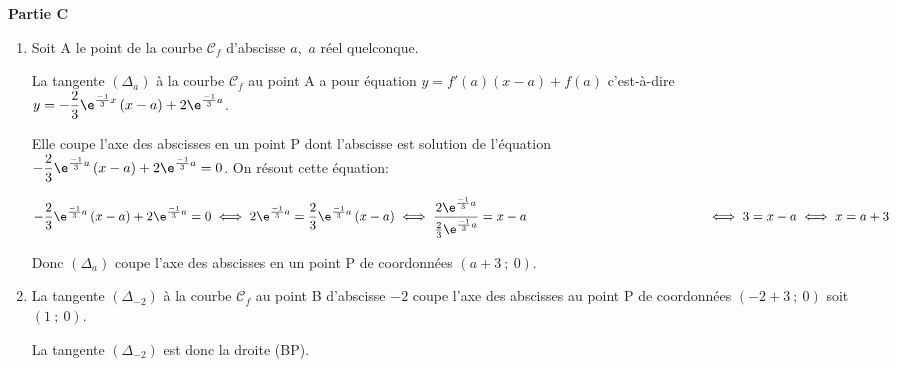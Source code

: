 \bigskip

\textbf{Partie C}

\medskip

\begin{enumerate}

\item Soit A le point de la courbe $\mathcal{C}_f$ d'abscisse $a$,\, $a$ réel quelconque.

La tangente $\left(\Delta_a\right)$ à la courbe $\mathcal{C}_f$ au point A a pour équation
$y=f'(a) \left (x-a\right )+f(a)$ c'est-à-dire 
$y=-\dfrac{2}{3}\e^{\frac{-1}{3}x}\left (x-a\right )+2\e^{\frac{-1}{3}a}$.

Elle coupe l'axe des abscisses en un point P dont l'abscisse est solution de l'équation \\
$-\dfrac{2}{3}\e^{\frac{-1}{3}a}\left (x-a\right )+2\e^{\frac{-1}{3}a} = 0$.
On résout cette équation:

$-\dfrac{2}{3}\e^{\frac{-1}{3}a}\left (x-a\right )+2\e^{\frac{-1}{3}a} = 0
\iff  2\e^{\frac{-1}{3}a} = \dfrac{2}{3}\e^{\frac{-1}{3}a}\left (x-a\right )
\iff \dfrac{2\e^{\frac{-1}{3}a}}{\frac{2}{3}\e^{\frac{-1}{3}a}}=x-a\\
\phantom{-\dfrac{2}{3}\e^{\frac{-1}{3}a}\left (x-a\right )+2\e^{\frac{-1}{3}a} = 0}
\iff 3 = x-a \iff x=a+3$

Donc $\left(\Delta_a\right)$ coupe l'axe des abscisses en un point P de coordonnées $(a + 3~;~0)$.

\item La tangente $\left(\Delta_{-2}\right)$  à la courbe $\mathcal{C}_f$ au point B d'abscisse $- 2$ coupe l'axe des abscisses au point P de coordonnées $(-2+3~;~0)$ soit $(1~;~0)$.

La tangente $\left(\Delta_{-2}\right)$ est donc la droite (BP).
\end{enumerate}

